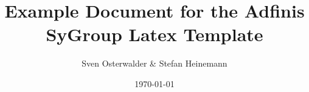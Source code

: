 \documentclass[oneside,DIV12,BCOR0.5cm]{adsyDoc}
\title{Example Document for the Adfinis SyGroup Latex Template}
\author{Sven Osterwalder \& Stefan Heinemann}
\date{\today}
\begin{document}
\maketitle{}
%

\tableofcontents{}


\end{document}

